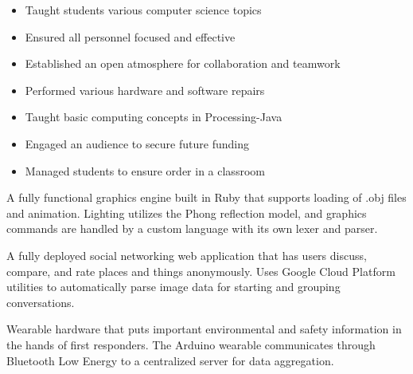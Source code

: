 \documentclass[10pt,a4paper,ragged2e,withhyper]{altacv}
\begin{document}
\begin{paracol}{2}
\divider{}

\begin{itemize}
\item Taught students various computer science topics
\item Ensured all personnel focused and effective
\item Established an open atmosphere for collaboration and teamwork
\item Performed various hardware and software repairs
\end{itemize}


\begin{itemize}
\item Taught basic computing concepts in Processing-Java
\item Engaged an audience to secure future funding
\item Managed students to ensure order in a classroom
\end{itemize}


\small

\small{}A fully functional graphics engine built in Ruby that supports loading of .obj files and animation.
Lighting utilizes the Phong reflection model, and graphics commands are handled by a custom language with its own lexer and parser.

\divider{}

\small{}A fully deployed social networking web application that has users discuss, compare, and rate places and things anonymously.
Uses Google Cloud Platform utilities to automatically parse image data for starting and grouping conversations.

\divider{}

\small{}Wearable hardware that puts important environmental and safety information in the hands of first responders.
The Arduino wearable communicates through Bluetooth Low Energy to a centralized server for data aggregation.


\end{paracol}
\end{document}
